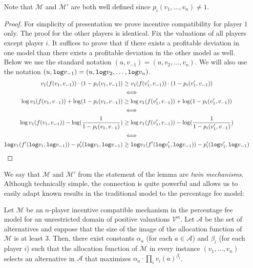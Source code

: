 \documentclass{theoretics}
\newcommand{\cM}{{\mathcal M}}
\newcommand{\cV}{{\mathcal V}}
\begin{document}
Note that $\cM$ and $\cM'$ are both well defined since $p_i(v_1,\ldots, v_n)\neq 1$.



\begin{proof}
For simplicity of presentation we prove incentive compatibility for player $1$ only. The proof for the other players is identical. Fix the valuations of all players except player $i$. It suffices to prove that if there exists a profitable deviation in one model than there exists a profitable deviation in the other model as well. Below we use the standard notation $(u,v_{-1})=(u,v_2,\ldots, v_n)$. We will also use the notation  $(u,{\tt log}v_{-1})=(u,{\tt log}v_2,\ldots, {\tt log}v_n)$.
\begin{align*}
\begin{split}
v_1(f(v_1,v_{-1}))\cdot (1- p_i(v_1,v_{-1})) &\geq v_1(f(v'_1,v_{-1}))\cdot  (1-p_i(v'_1,v_{-1}))\\
&\iff\\
\log v_1(f(v_1,v_{-1}))+\log (1- p_i(v_1,v_{-1})) &\geq \log v_1(f(v'_1,v_{-1}))+\log  (1-p_i(v'_1,v_{-1}))\\
&\iff\\
\log v_1(f(v_1,v_{-1}))-\log (\frac 1 {1- p_i(v_1,v_{-1})}) &\geq 
\log v_1(f(v'_1,v_{-1}))-\log  (\frac 1 {1-p_i(v'_1,v_{-1})})\\
&\iff \\
{\tt log} v_1(f'({\tt log}v_1,{\tt log}v_{-1}))-p'_i({\tt log}v_1,{\tt log}v_{-1}) &\geq
 {\tt log} v_1(f'({\tt log}v'_1,{\tt log}v_{-1}))-p'_i({\tt log}v'_1,{\tt log}v_{-1})
\end{split}
\end{align*}


\end{proof}

We say that $\cM$ and $\cM'$ from the statement of the lemma are \emph{twin mechanisms}. Although technically simple, the connection is quite powerful and allows us to easily adapt known results in the traditional model to the percentage fee model:




\begin{theorem}
Let $\cM$ be an $n$-player incentive compatible mechanism in the percentage fee model for an unrestricted domain of positive valuations $\cV^n$. Let $\mathcal A$ be the set of alternatives and suppose that the size of the image of the allocation function of $\cM$ is at least $3$. Then, there exist constants $\alpha_a$ (for each $a\in \mathcal A$) and $\beta_i$ (for each player $i$) such that the allocation function of $\cM$ in every instance $(v_1,\ldots, v_n)$ selects an alternative in $\mathcal A$ that maximizes  $\alpha_a\cdot \prod_iv_i(a)^{\beta_i}$.
\end{theorem}
\end{document}

